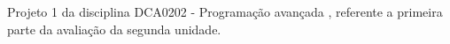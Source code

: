 Projeto 1 da disciplina D\+C\+A0202 -\/ Programação avançada , referente a primeira parte da avaliação da segunda unidade. 